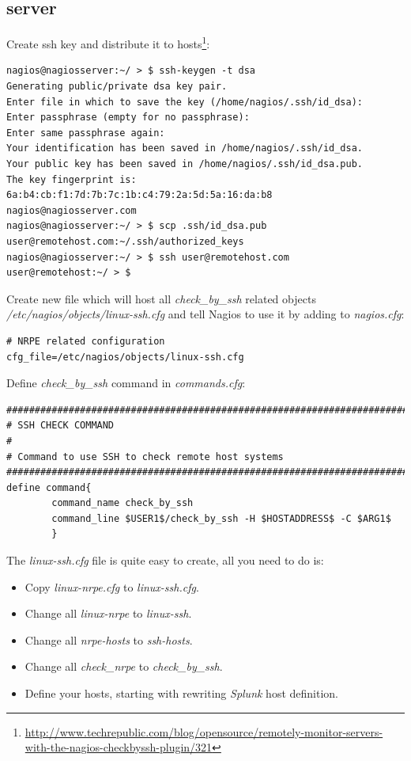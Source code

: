 \documentclass[10pt,a4paper,final]{report}
\begin{document}
\subsection{server}
Create ssh key and distribute it to hosts\footnote{\url{http://www.techrepublic.com/blog/opensource/remotely-monitor-servers-with-the-nagios-checkbyssh-plugin/321}}:
\begin{lstlisting}
nagios@nagiosserver:~/ > $ ssh-keygen -t dsa
Generating public/private dsa key pair.
Enter file in which to save the key (/home/nagios/.ssh/id_dsa):
Enter passphrase (empty for no passphrase):
Enter same passphrase again:
Your identification has been saved in /home/nagios/.ssh/id_dsa.
Your public key has been saved in /home/nagios/.ssh/id_dsa.pub.
The key fingerprint is:
6a:b4:cb:f1:7d:7b:7c:1b:c4:79:2a:5d:5a:16:da:b8 nagios@nagiosserver.com
nagios@nagiosserver:~/ > $ scp .ssh/id_dsa.pub user@remotehost.com:~/.ssh/authorized_keys
nagios@nagiosserver:~/ > $ ssh user@remotehost.com
user@remotehost:~/ > $
\end{lstlisting}
Create new file which will host all \emph{check\_by\_ssh} related objects \emph{/etc/nagios/objects/linux-ssh.cfg} and tell Nagios to use it by adding to \emph{nagios.cfg}:
\begin{lstlisting}
# NRPE related configuration
cfg_file=/etc/nagios/objects/linux-ssh.cfg
\end{lstlisting}
Define \emph{check\_by\_ssh} command in \emph{commands.cfg}:
\begin{lstlisting}
###############################################################################
# SSH CHECK COMMAND
#
# Command to use SSH to check remote host systems
###############################################################################
define command{
        command_name check_by_ssh
        command_line $USER1$/check_by_ssh -H $HOSTADDRESS$ -C $ARG1$
        }
\end{lstlisting}
The \emph{linux-ssh.cfg} file is quite easy to create, all you need to do is:
\begin{itemize}
\item Copy \emph{linux-nrpe.cfg} to \emph{linux-ssh.cfg}.
\item Change all \emph{linux-nrpe} to \emph{linux-ssh}.
\item Change all \emph{nrpe-hosts} to \emph{ssh-hosts}.
\item Change all \emph{check\_nrpe} to \emph{check\_by\_ssh}.
\item Define your hosts, starting with rewriting \emph{Splunk} host definition.
\end{itemize}
\end{document}
